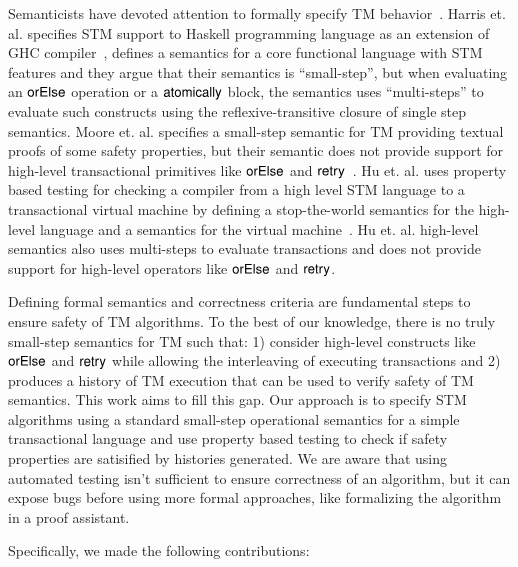 \documentclass[3p,times,procedia]{elsarticle}
\theoremstyle{definition}
\newcommand{\F}[1]{\green{\mathsf{#1}}}
\begin{document}
Semanticists have devoted attention to formally specify TM behavior~\cite{Moore2008,Koskinen2010,Abadi2011,Harris05}.
Harris et. al. specifies STM support to Haskell programming language as an extension of GHC compiler~\cite{Harris05},
defines a semantics for a core functional language with STM features and they argue that their semantics is ``small-step'',
but when evaluating an \ensuremath{\F{orElse}} operation or a \ensuremath{\F{atomically}} block, the semantics uses ``multi-steps'' to evaluate such constructs
using the reflexive-transitive closure of single step semantics. Moore et. al. specifies a small-step semantic for TM providing
textual proofs of some safety properties, but their semantic does not provide support for high-level transactional primitives
like \ensuremath{\F{orElse}} and \ensuremath{\F{retry}}~\cite{Moore2008}. Hu et. al. uses property based testing for checking a compiler from a high level
STM language to a transactional virtual machine by defining a stop-the-world semantics for the high-level language and a semantics
for the virtual machine~\cite{Hu08}. Hu et. al. high-level semantics also uses multi-steps to evaluate transactions and does not
provide support for high-level operators like \ensuremath{\F{orElse}} and \ensuremath{\F{retry}}.

Defining formal semantics and correctness criteria are fundamental steps to ensure safety of TM algorithms.
To the best of our knowledge, there is no truly small-step semantics for TM such that: 1) consider high-level constructs like \ensuremath{\F{orElse}}
and \ensuremath{\F{retry}} while allowing the interleaving of executing transactions and 2) produces a history of TM execution that can be used to verify
safety of TM semantics. This work aims to fill this gap. Our approach is to specify STM algorithms
using a standard small-step operational semantics
for a simple transactional language and use property based testing to check if safety properties are satisified by histories generated.
We are aware that using automated testing isn't sufficient to ensure correctness of an algorithm, but
it can expose bugs before using more formal approaches, like formalizing the algorithm in a proof assistant.

Specifically, we made the following contributions:
\end{document}
